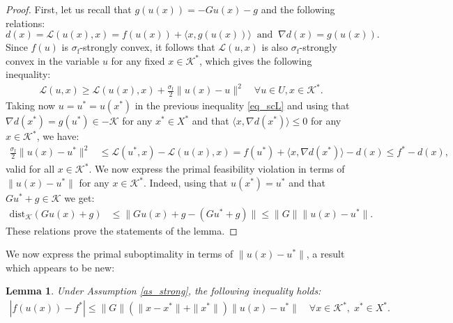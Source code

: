 \documentclass{gOMS2e}
\theoremstyle{plain}
\newtheorem{lemma}[theorem]{Lemma}
\theoremstyle{definition}
\theoremstyle{remark}
\begin{document}
\begin{proof} First, let us recall that $g(u(x)) = - G u(x) - g$ and the
following relations:
\[ d(x) = {\mathcal{L}}(u(x),x) =f({}{u}(x)) + \langle
x, g( {}{u}(x))  \rangle \;\;  \text{and} \;\; \nabla d(x)=
g({}{u}(x)). \] Since $f(u)$ is $\sigma_{\mathrm{f}}$-strongly
convex, it follows that $\mathcal{L}(u,x)$ is also
$\sigma_{\mathrm{f}}$-strongly convex in the variable ${}{u}$ for
any fixed $x \in {\mathcal{K}}^*$, which gives the following inequality:
\begin{align}
\label{eq_scL} \mathcal{L}(u,x) \geq \mathcal{L}(u(x),x) +
\frac{\sigma_{\mathrm{f}}}{2}\|{}{u}(x) - u\|^2 \quad \forall u \in
U, x \in {\mathcal{K}}^*.
\end{align}
Taking now $u = u^* = u(x^*)$ in  the previous inequality \eqref{eq_scL} and
using  that $\nabla d(x^*) = g(u^*)   \in - {\mathcal{K}}$ for any $x^* \in X^*$
and that $\langle x, \nabla d(x^*) \rangle \leq 0$ for any $x \in {{\mathcal{K}}^*}$,
we have:
\begin{align*}
 \frac{\sigma_{\mathrm{f}}}{2}\|{}{u}(x) - {}{u}^*\|^2
&\leq {\mathcal{L}}({}{u}^*,x) - {\mathcal{L}}(u(x),x) = f(u^*)+ \langle x, \nabla
d(x^*)\rangle - d(x) \leq f^*-d(x),
\end{align*}
valid for all $x \in {{\mathcal{K}}^*}$.  We now express the primal
feasibility violation  in terms of $\| {}{u}(x) - u^*\|$ for any $x
\in {{\mathcal{K}}^*}$. Indeed, using that $u(x^*) = u^*$ and that $G u^* + g
\in {\mathcal{K}}$ we get:
\begin{align*}
\text{dist}_{\mathcal{K}}(G u(x) + g) & \leq \| G u(x) + g - (G u^* + g ) \|
 \leq \|G\| \| {}{u}(x) - u^* \|.
\end{align*}
These relations prove the statements of the lemma.
\end{proof}

\noindent We now express the   primal suboptimality in terms of $\|
{}{u}(x) - u^*\|$, a result which appears to be new:

\begin{lemma}
Under Assumption \ref{as_strong}, the following inequality holds:
\begin{align}
\label{ineq_opt} |f(u(x)) - f^*| \leq \|G\| \left( \|x - x^*\| +
\|x^*\| \right )   \| {}{u}(x) -  u^* \| \quad \forall x \in {{\mathcal{K}}^*}, \;
x^* \in X^*.
\end{align}
\end{lemma}
\end{document}
